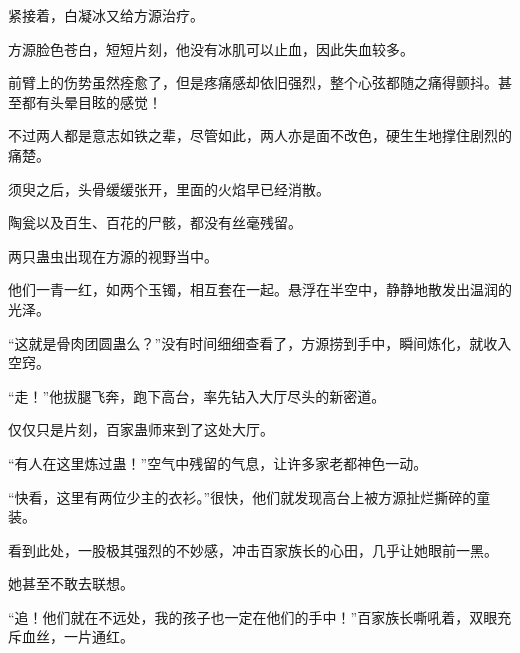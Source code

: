 \begin{this_body}
紧接着，白凝冰又给方源治疗。

方源脸色苍白，短短片刻，他没有冰肌可以止血，因此失血较多。

前臂上的伤势虽然痊愈了，但是疼痛感却依旧强烈，整个心弦都随之痛得颤抖。甚至都有头晕目眩的感觉！

不过两人都是意志如铁之辈，尽管如此，两人亦是面不改色，硬生生地撑住剧烈的痛楚。

须臾之后，头骨缓缓张开，里面的火焰早已经消散。

陶瓮以及百生、百花的尸骸，都没有丝毫残留。

两只蛊虫出现在方源的视野当中。

他们一青一红，如两个玉镯，相互套在一起。悬浮在半空中，静静地散发出温润的光泽。

“这就是骨肉团圆蛊么？”没有时间细细查看了，方源捞到手中，瞬间炼化，就收入空窍。

“走！”他拔腿飞奔，跑下高台，率先钻入大厅尽头的新密道。

仅仅只是片刻，百家蛊师来到了这处大厅。

“有人在这里炼过蛊！”空气中残留的气息，让许多家老都神色一动。

“快看，这里有两位少主的衣衫。”很快，他们就发现高台上被方源扯烂撕碎的童装。

看到此处，一股极其强烈的不妙感，冲击百家族长的心田，几乎让她眼前一黑。

她甚至不敢去联想。

“追！他们就在不远处，我的孩子也一定在他们的手中！”百家族长嘶吼着，双眼充斥血丝，一片通红。

\end{this_body}

